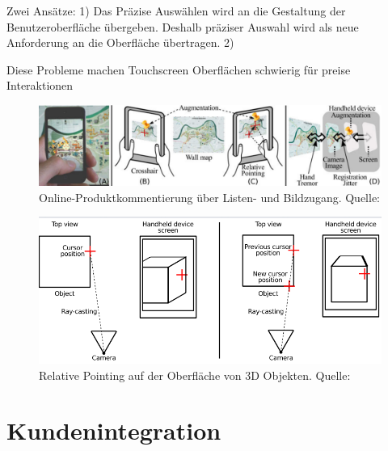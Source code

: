 Zwei Ansätze: 1) Das Präzise Auswählen wird an die Gestaltung der Benutzeroberfläche übergeben. Deshalb präziser Auswahl wird als neue Anforderung 
an die Oberfläche übertragen. 2) 

Diese Probleme machen Touchscreen Oberflächen schwierig für preise Interaktionen  


\cite[S.~150]{Bowman2011}


\begin{figure}[H]
	\centering
	\includegraphics[width=1.0\textwidth]{resources/analyse/Pointing_techniken.png}
	\caption{Online-Produktkommentierung über Listen- und Bildzugang. Quelle: \cite{Vincent2013}}
	\label{img:pointing_vergleich}
\end{figure}

\begin{figure}[H]
	\centering
	\includegraphics[width=1.0\textwidth]{resources/analyse/pointing_3d.png}
	\caption{Relative Pointing auf der Oberfläche von 3D Objekten. Quelle: \cite[S.~92]{Vincent2014}}
	\label{img:pointing_vergleich}
\end{figure}

\section{Kundenintegration}


